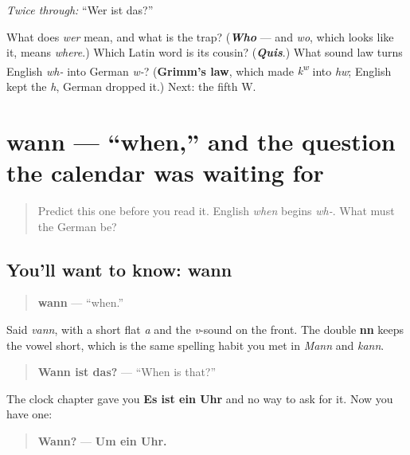 \emph{Twice through:} \textquotedblleft{}Wer ist das?\textquotedblright{}

\begin{tcolorbox}[breakable,colback=teal!4,colframe=teal!35!black,title={Before you move on}]
What does \emph{wer} mean, and what is the trap? (\emph{\textbf{Who}} — and \emph{wo}, which looks like it, means \emph{where}.) Which Latin word is its cousin? (\emph{\textbf{Quis}}.) What sound law turns English \emph{wh-} into German \emph{w-}? (\textbf{Grimm's law}, which made \emph{k\textsuperscript{w}} into \emph{hw}; English kept the \emph{h}, German dropped it.) Next: the fifth W.
\end{tcolorbox}
\section[wann]{wann — \textquotedblleft{}when,\textquotedblright{} and the question the calendar was waiting for}

\label{lesson:GE-C33-wann}



\begin{quote}
Predict this one before you read it. English \emph{when} begins \emph{wh-}. What must the German be?
\end{quote}

\subsection*{You'll want to know: wann}
\begin{quote}
\textbf{wann} — \textquotedblleft{}when.\textquotedblright{}
\end{quote}

Said \emph{vann}, with a short flat \emph{a} and the \emph{v}-sound on the front. The double \textbf{nn} keeps the vowel short, which is the same spelling habit you met in \emph{Mann} and \emph{kann}.

\begin{quote}
\textbf{Wann ist das?} — \textquotedblleft{}When is that?\textquotedblright{}
\end{quote}

The clock chapter gave you \textbf{Es ist ein Uhr} and no way to ask for it. Now you have one:

\begin{quote}
\textbf{Wann?} — \textbf{Um ein Uhr.}
\end{quote}

